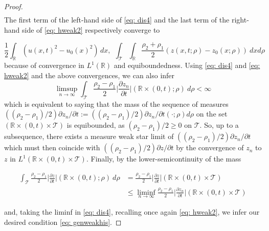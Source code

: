 \documentclass[12pt]{article}
\newcommand{\R}{\mathbb{R}}
\newcommand{\T}{\mathcal{T}}
\newcommand{\p}{\rho}
\newcommand{\1}{\mathds{1}}
\theoremstyle{definition}
\begin{document}
\begin{proof}
\begin{equation}
\begin{split}
        \end{split}
   \end{equation} 
 The first term of the left-hand side of \eqref{eq: dis4} and the last term of the right-hand side of \eqref{eq: hweak2} respectively converge to 

   \[
\frac{1}{2}\int_\R \left(u(x,t)^2 -u_0(x)^2\right)\,dx,\ \  \int_{\T} \int_{\R} \frac{\p_2+\p_1}{2} (z(x,t;\p)-z_0(x;\p) )~ dx d\p
   \]
because of convergence in $L^1(\mathbb{R})$ and equiboundedness. Using \eqref{eq: dis4} and \eqref{eq: hweak2} and the above convergences, we can also infer \begin{equation}
       \limsup_{n\to \infty} \int_{\T} \frac{\p_2-\p_1}{2}  \bigg|\frac{\partial z_n}{\partial t}\bigg|(\R \times (0,t);\p)~ d\p  <\infty
   \end{equation} which is equivalent to saying that the mass of the sequence of measures $((\p_2-\p_1)/2) \partial z_n / \partial t:=((\p_2-\p_1)/2) \partial z_n / \partial t(\cdot;\rho)d\rho$ on the set $(\R \times (0,t) \times \T)$ is equibounded, as $(\p_2-\p_1)/2\geq 0$ on $\T$. So, up to a subsequence, there exists a measure weak star limit of $((\p_2-\p_1)/2)\partial z_n /\partial t$ which must then coincide with $((\p_2-\p_1)/ 2)\partial z / \partial t$  by the convergence of $z_n$ to $z$ in $L^1(\R\times(0,t)\times \T).$ Finally, by the lower-semicontinuity of the mass 
   
   \[
   \begin{split}
   \int_{\T} \frac{\p_2-\p_1}{2}  \bigg|\frac{\partial z}{\partial t}\bigg|(\R \times (0,t);\p)~ d\p &= \frac{\p_2-\p_1}{2}\bigg|\frac{\partial z}{\partial t} \bigg|(\R \times (0,t) \times \T)\\&\leq \liminf_{n\to \infty} \frac{\p_2-\p_1}{2}\bigg|\frac{\partial z_n}{\partial t}\bigg|(\R \times (0,t)\times \T)\end{split}
   \] 

   \noindent
   and, taking the liminf in \eqref{eq: dis4}, recalling once again \eqref{eq: hweak2}, we infer our desired condition \eqref{eq: genweakhis}.
\end{proof}


\end{document}
